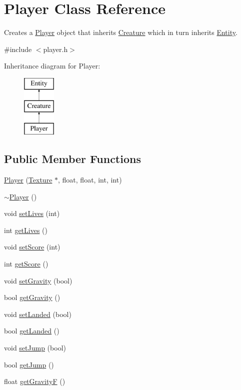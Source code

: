 \hypertarget{class_player}{\section{Player Class Reference}
\label{class_player}
}


Creates a \hyperlink{class_player}{Player} object that inherits \hyperlink{class_creature}{Creature} which in turn inherits \hyperlink{class_entity}{Entity}.  




{\ttfamily \#include $<$player.\+h$>$}

Inheritance diagram for Player\+:\begin{figure}[H]
\begin{center}
\leavevmode
\includegraphics[height=3.000000cm]{class_player}
\end{center}
\end{figure}
\subsection*{Public Member Functions}
\begin{DoxyCompactItemize}
\item 
\hyperlink{class_player_a73d9a9d1017a68d6de107bbfb0a0c486}{Player} (\hyperlink{class_texture}{Texture} $\ast$, float, float, int, int)
\item 
\hyperlink{class_player_a749d2c00e1fe0f5c2746f7505a58c062}{$\sim$\+Player} ()
\item 
void \hyperlink{class_player_a565d4df3c32d00243b1ef16dfd6e5e03}{set\+Lives} (int)
\item 
int \hyperlink{class_player_af56ac33b9b2ebd9f97c8a6f485cf2d47}{get\+Lives} ()
\item 
void \hyperlink{class_player_aa054ea95ca73dd19036d2917b29ab021}{set\+Score} (int)
\item 
int \hyperlink{class_player_a97e5447778ae6c384eedc532dcd8431d}{get\+Score} ()
\item 
void \hyperlink{class_player_a36a300f4f62fae25747c4301a81c5a10}{set\+Gravity} (bool)
\item 
bool \hyperlink{class_player_a7f8e925cef6578c511f0b215f309d814}{get\+Gravity} ()
\item 
void \hyperlink{class_player_a3474c047c1495322742b79a43381bc32}{set\+Landed} (bool)
\item 
bool \hyperlink{class_player_acda5f8d74dcb44e5ebc12003104ec0ef}{get\+Landed} ()
\item 
void \hyperlink{class_player_a282bc0d3c7341a9727bcb16cd902c953}{set\+Jump} (bool)
\item 
bool \hyperlink{class_player_a4760bc30c5c2f45c7a858496a395981f}{get\+Jump} ()
\item 
float \hyperlink{class_player_ae0ae09987c59e99aa451481bf827093c}{get\+Gravity\+F} ()
\end{DoxyCompactItemize}
